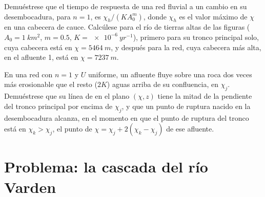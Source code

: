 \begin{exercise}[$\star\star\star$]\label{exo:b3:quantitative-geomorphology:11}
Demuéstrese que el tiempo de respuesta de una red fluvial a un cambio en su desembocadura,
para $n = 1$, es $\chi_h/(K A_0^m)$, donde $\chi_h$ es el valor máximo de
$\chi$ en una cabecera de cauce. Calcúlese para el río de tierras altas de las figuras
($A_0 = \qty{1}{km^2}$, $m = 0.5$, $K = \qty{e-6}{yr^{-1}}$), primero para su
tronco principal solo, cuya cabecera está en $\chi = \qty{5464}{m}$, y después para la red,
cuya cabecera más alta, en el afluente 1, está en $\chi = \qty{7237}{m}$.
\end{exercise}

\begin{exercise}[$\star\star\star$]\label{exo:b3:quantitative-geomorphology:12}
En una red con $n = 1$ y $U$ uniforme, un afluente fluye sobre una roca dos veces
más erosionable que el resto ($2K$) aguas arriba de su confluencia, en $\chi_j$. Demuéstrese que
su línea de  en el plano $(\chi, z)$ tiene la mitad de la pendiente del
tronco principal por encima de $\chi_j$, y que un punto de ruptura nacido en la desembocadura alcanza,
en el momento en que el punto de ruptura del tronco está en $\chi_k > \chi_j$, el punto
de $\chi = \chi_j + 2(\chi_k - \chi_j)$ de ese afluente.
\end{exercise}

\section{Problema: la cascada del río Varden}

